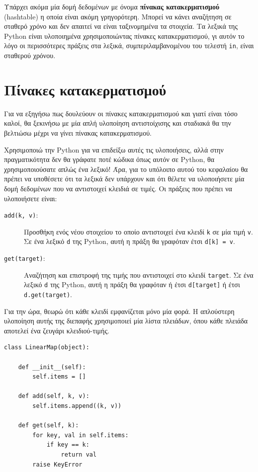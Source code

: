 \documentclass[10pt]{book}
\begin{document}
Υπάρχει ακόμα μία δομή δεδομένων με όνομα {\bf πίνακας κατακερματισμού} (hashtable) η οποία είναι ακόμη
γρηγορότερη.  Μπορεί να κάνει αναζήτηση σε σταθερό χρόνο και δεν απαιτεί να είναι ταξινομημένα τα στοιχεία.
Τα λεξικά της Python είναι υλοποιημένα χρησιμοποιώντας πίνακες κατακερματισμού, γι αυτόν το λόγο οι
περισσότερες πράξεις στα λεξικά, συμπεριλαμβανομένου του τελεστή {\tt in}, είναι σταθερού χρόνου.



\section{Πίνακες κατακερματισμού}
\label{hashtable}

Για να εξηγήσω πως δουλεύουν οι πίνακες κατακερματισμού και γιατί είναι τόσο καλοί, θα ξεκινήσω με μία απλή
υλοποίηση αντιστοίχισης και σταδιακά θα την βελτιώσω μέχρι να γίνει πίνακας κατακερματισμού.

Χρησιμοποιώ την Python για να επιδείξω αυτές τις υλοποιήσεις, αλλά στην πραγματικότητα δεν θα γράφατε ποτέ
κώδικα όπως αυτόν σε Python, θα χρησιμοποιούσατε απλώς ένα λεξικό!  Άρα, για το υπόλοιπο αυτού του κεφαλαίου 
θα πρέπει να υποθέσετε ότι τα λεξικά δεν υπάρχουν και ότι θέλετε να υλοποιήσετε μία δομή δεδομένων που να
αντιστοιχεί κλειδιά σε τιμές. Οι πράξεις που πρέπει να υλοποιήσετε είναι:

\begin{description}

\item[{\tt add(k, v)}:] Προσθήκη ενός νέου στοιχείου το οποίο αντιστοιχεί ένα κλειδί {\tt k} σε μία τιμή {\tt v}.
Σε ένα λεξικό {\tt d} της Python, αυτή η πράξη θα γραφόταν έτσι {\tt d[k] = v}.

\item[{\tt get(target)}:] Αναζήτηση και επιστροφή της τιμής που αντιστοιχεί στο κλειδί {\tt target}. Σε ένα
λεξικό {\tt d} της Python, αυτή η πράξη θα γραφόταν ή έτσι {\tt d[target]} ή έτσι {\tt d.get(target)}.

\end{description}

Για την ώρα, θεωρώ ότι κάθε κλειδί εμφανίζεται μόνο μία φορά.  Η απλούστερη υλοποίηση αυτής της διεπαφής
χρησιμοποιεί μία λίστα πλειάδων, όπου κάθε πλειάδα αποτελεί ένα ζευγάρι κλειδιού-τιμής. 

\begin{verbatim}
class LinearMap(object):

    def __init__(self):
        self.items = []

    def add(self, k, v):
        self.items.append((k, v))

    def get(self, k):
        for key, val in self.items:
            if key == k:
                return val
        raise KeyError
\end{verbatim}
\end{document}
